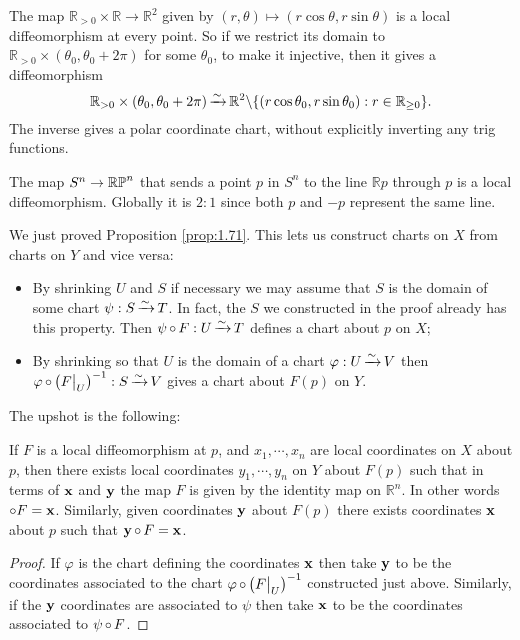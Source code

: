 \documentclass[a4paper,11pt]{article}
\begin{document}
	\begin{ex}
		The map $\mathbb{R}_{>0} \times \mathbb{R} \to \mathbb{R}^2$ given by $(r,\theta)\mapsto (r \cos \theta, r \sin \theta)$ is a local diffeomorphism at every point. So if we restrict its domain to $\mathbb{R}_{>0} \times (\theta_0 ,\theta_0 + 2 \pi)$ for some $\theta_0$, to make it injective, then it gives a diffeomorphism
		\[
			\mathbb{R}_{>0} \times (\theta_0 ,\theta_0 + 2 \pi) \operatorname{\xrightarrow{\sim}} \mathbb{R}^2 \backslash \{(r \cos \theta_0 , r \sin \theta_0): r \in \mathbb{R}_{\geq 0}\}.
		\]
		The inverse gives a polar coordinate chart, without explicitly inverting any trig functions.
	\end{ex}

	\begin{ex}
		The map $S^n \to \mathbb{RP}^{n}$ that sends a point $p$ in $S^n$ to the line $\mathbb{R} p $ through $p$ is a local diffeomorphism. Globally it is $2 : 1$ since both $p$ and $-p$ represent the same line.
	\end{ex}

	We just proved Proposition \ref{prop:1.71}. This lets us construct charts on $X$ from charts on $Y$ and vice versa:
	\begin{itemize}
		\item By shrinking $U$ and $S$ if necessary we may assume that $S$ is the domain of some chart $\psi : S \operatorname{\xrightarrow{\sim}} T$. In fact, the $S$ we constructed in the proof already has this property. Then $\psi \operatorname{\circ} F : U \operatorname{\xrightarrow{\sim}} T$ defines a chart about $p$ on $X$;
		\item By shrinking so that $U$ is the domain of a chart $\varphi: U \operatorname{\xrightarrow{\sim}} V$ then $\varphi \operatorname{\circ} \left( F\big|_U \right)^{-1} : S \operatorname{\xrightarrow{\sim}} V$ gives a chart about $F(p)$ on $Y$. 
	\end{itemize}

	The upshot is the following:

	\begin{lem}
		If $F$ is a local diffeomorphism at $p$, and $x_1, \cdots, x_n$ are local coordinates on $X$ about $p$, then there exists local coordinates $y_1, \cdots, y_n$ on $Y$ about $F(p)$ such that in terms of $\vb x$ and $\vb y$ the map $F$ is given by the identity map on $\mathbb{R}^n$. In other words $\vb \cpf F = \vb x$. Similarly, given coordinates $\vb y$ about $F(p)$ there exists coordinates $\vb x$ about $p$ such that $\vb y \operatorname{\circ} F = \vb x$.
	\end{lem}
	\begin{proof}
		If $\varphi$ is the chart defining the coordinates $\vb x$ then take $\vb y$ to be the coordinates associated to the chart $\varphi \operatorname{\circ} \left( F \big|_U \right)^{-1}$ constructed just above. Similarly, if the $\vb y$ coordinates are associated to $\psi$ then take $\vb x$ to be the coordinates associated to $\psi \operatorname{\circ} F$. 
	\end{proof}
\end{document}
